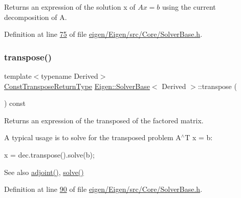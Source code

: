 \begin{DoxyReturn}{Returns}
an expression of the solution x of $ A x = b $ using the current decomposition of A. 
\end{DoxyReturn}


Definition at line \hyperlink{eigen_2_eigen_2src_2_core_2_solver_base_8h_source_l00075}{75} of file \hyperlink{eigen_2_eigen_2src_2_core_2_solver_base_8h_source}{eigen/\+Eigen/src/\+Core/\+Solver\+Base.\+h}.

\mbox{\label{class_eigen_1_1_solver_base_a732e75b5132bb4db3775916927b0e86c}} 
\subsubsection{\texorpdfstring{transpose()}{transpose()}\hspace{0.1cm}{\footnotesize\ttfamily [1/2]}}
{\footnotesize\ttfamily template$<$typename Derived$>$ \\
\hyperlink{group___core___module_class_eigen_1_1_transpose}{Const\+Transpose\+Return\+Type} \hyperlink{class_eigen_1_1_solver_base}{Eigen\+::\+Solver\+Base}$<$ Derived $>$\+::transpose (\begin{DoxyParamCaption}{ }\end{DoxyParamCaption}) const\hspace{0.3cm}{\ttfamily [inline]}}

\begin{DoxyReturn}{Returns}
an expression of the transposed of the factored matrix.
\end{DoxyReturn}
A typical usage is to solve for the transposed problem A$^\wedge$T x = b\+: 
\begin{DoxyCode}
x = dec.transpose().solve(b); 
\end{DoxyCode}


\begin{DoxySeeAlso}{See also}
\hyperlink{class_eigen_1_1_solver_base_a05a3686a89888681c8e0c2bcab6d1ce5}{adjoint()}, \hyperlink{class_eigen_1_1_solver_base_a7fd647d110487799205df6f99547879d}{solve()} 
\end{DoxySeeAlso}


Definition at line \hyperlink{eigen_2_eigen_2src_2_core_2_solver_base_8h_source_l00090}{90} of file \hyperlink{eigen_2_eigen_2src_2_core_2_solver_base_8h_source}{eigen/\+Eigen/src/\+Core/\+Solver\+Base.\+h}.

